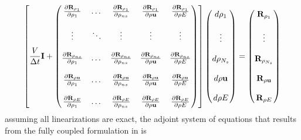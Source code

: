 \begin{equation}
  \left[ 
    \frac{V}{\Delta t} \mi + 
    \begin{pmatrix}
      \tdiff{\rho_1}{\rho_1}    & \dots  & \tdiff{\rho_{ns}}{\rho_1}    & \tdiff{\rho \vu}{\rho_1}    & \tdiff{\rho E}{\rho_1} \\ \\
      \vdots                    & \ddots & \vdots                       & \vdots                      & \vdots                   \\ \\
      \tdiff{\rho_1}{\rho_{ns}} & \dots  & \tdiff{\rho_{ns}}{\rho_{ns}} & \tdiff{\rho \vu}{\rho_{ns}} & \tdiff{\rho E}{\rho_{ns}} \\ \\
      \tdiff{\rho_1}{\rho \vu}  & \dots  & \tdiff{\rho_{ns}}{\rho \vu}  & \tdiff{\rho \vu}{\rho \vu}  & \tdiff{\rho E}{\rho \vu} \\ \\
      \tdiff{\rho_1}{\rho E}    & \dots  & \tdiff{\rho_{ns}}{\rho E}    & \tdiff{\rho \vu}{\rho E}    & \tdiff{\rho E}{\rho E}
    \end{pmatrix}
  \right]
  \begin{pmatrix}
    d \rho_1     \\ \\
    \vdots       \\ \\
    d \rho_{N_s} \\ \\
    d \rho \vu   \\ \\
    d \rho E
  \end{pmatrix}
  =
  \begin{pmatrix}
    \res{\rho_1}     \\ \\
    \vdots           \\ \\
    \res{\rho_{N_s}} \\ \\
    \res{\rho \vu}   \\ \\
    \res{\rho E}
  \end{pmatrix}
  \label{fc-flow}
\end{equation}
assuming all linearizations are exact, the adjoint system of equations that
results from the fully coupled formulation in  is

